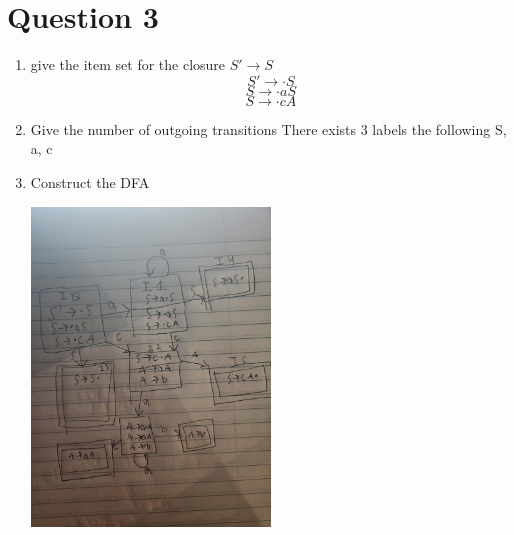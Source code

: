 \documentclass{article}
\begin{document}
    \section*{Question 3}
    \begin{enumerate}
	\item give the item set for the closure $S' \rightarrow S$
		\[ S' \rightarrow \cdot{} S\]
		\[ S \rightarrow \cdot{} aS\]
		\[ S \rightarrow \cdot{} cA\]
	\item Give the number of outgoing transitions
	There exists 3 labels the following S, a, c
	\item Construct the DFA
	\begin{center}
            \includegraphics[width=0.5\textwidth, angle=0]{figures/DFA2.jpg}
	\end{center}
    \end{enumerate}

\newpage
\end{document}
